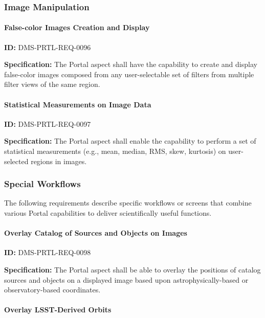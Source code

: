 \documentclass[SE,toc]{lsstdoc}
\begin{document}
\subsubsection{Image Manipulation}

\paragraph{False-color Images Creation and Display}\hfill  %

\label{DMS-PRTL-REQ-0096}
\textbf{ID:} DMS-PRTL-REQ-0096

\textbf{Specification:}
The Portal aspect shall have the capability to create and display false-color images composed from any user-selectable set of filters from multiple filter views of the same region.

\paragraph{Statistical Measurements on Image Data}\hfill  %

\label{DMS-PRTL-REQ-0097}
\textbf{ID:} DMS-PRTL-REQ-0097

\textbf{Specification:}
The Portal aspect shall enable the capability to perform a set of statistical measurements (e.g., mean, median, RMS, skew, kurtosis) on user-selected regions in images.

\subsubsection{Special Workflows}

The following requirements describe specific workflows or screens that combine various Portal capabilities to deliver scientifically useful functions.

\paragraph{Overlay Catalog of Sources and Objects on Images}\hfill  %

\label{DMS-PRTL-REQ-0098}
\textbf{ID:} DMS-PRTL-REQ-0098

\textbf{Specification:}
The Portal aspect shall be able to overlay the positions of catalog sources and objects on a displayed image based upon astrophysically-based or observatory-based coordinates.

\paragraph{Overlay LSST-Derived Orbits}\hfill  %
\end{document}
